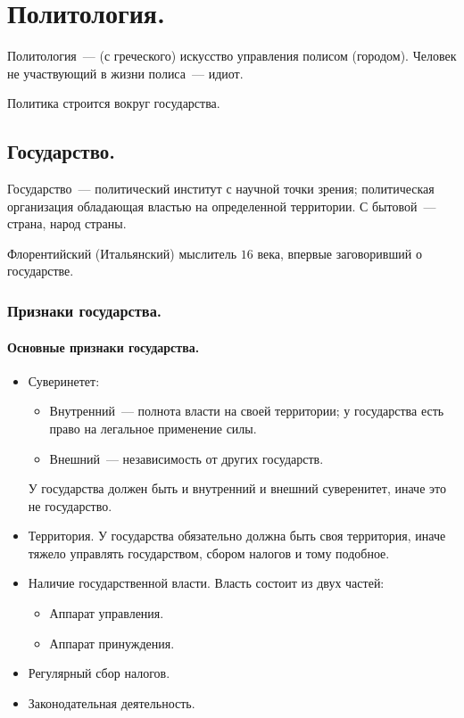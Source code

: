 \documentclass{article}
\begin{document}
	\tableofcontents
	\setcounter{tocdepth}{4}
	\newpage
	\section{Политология.}
	\begin{definition}
		Политология~--- (с греческого) искусство управления полисом (городом). Человек не участвующий в жизни полиса~--- идиот.
	\end{definition}
	\noindent
	Политика строится вокруг государства.
	\subsection{Государство.}
	\begin{definition}
		Государство~--- политический институт с научной точки зрения; политическая организация обладающая властью на определенной территории. С бытовой~--- страна, народ страны.
	\end{definition}
	\begin{person}
		Флорентийский (Итальянский) мыслитель $16$ века, впервые заговоривший о государстве.
	\end{person}
	\subsubsection{Признаки государства.}
	\paragraph{Основные признаки государства.}
	\begin{itemize}
		\item Суверинетет:
		\begin{itemize}
			\item Внутренний~--- полнота власти на своей территории; у государства есть право на легальное применение силы.
			\item Внешний~--- независимость от других государств.
		\end{itemize}
		У государства должен быть и внутренний и внешний суверенитет, иначе это не государство.
		\item Территория. У государства обязательно должна быть своя территория, иначе тяжело управлять государством, сбором налогов и тому подобное.
		\item Наличие государственной власти. Власть состоит из двух частей:
		\begin{itemize}
			\item Аппарат управления.
			\item Аппарат принуждения.
		\end{itemize}
		\item Регулярный сбор налогов.
		\item Законодательная деятельность.
	\end{itemize}
\end{document}
